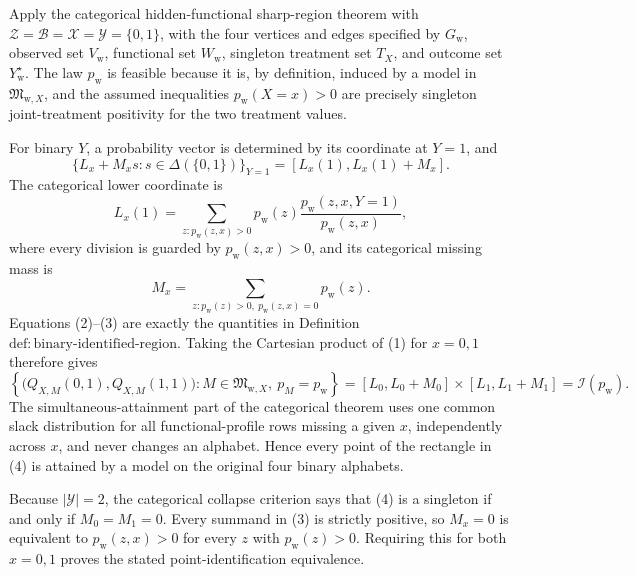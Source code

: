 Apply the categorical hidden-functional sharp-region theorem with
\(\mathcal Z=\mathcal B=\mathcal X=\mathcal Y=\{0,1\}\), with the four
vertices and edges specified by \(G_{\mathrm w}\), observed set
\(V_{\mathrm w}\), functional set \(W_{\mathrm w}\), singleton treatment
set \(T_X\), and outcome set \(Y_{\mathrm w}^{\star}\).  The law
\(p_{\mathrm w}\) is feasible because it is, by definition, induced by a
model in \(\mathfrak M_{\mathrm w,X}\), and the assumed inequalities
\(p_{\mathrm w}(X=x)>0\) are precisely singleton joint-treatment
positivity for the two treatment values.

For binary \(Y\), a probability vector is determined by its coordinate at
\(Y=1\), and
\[
 \{L_x+M_xs:s\in\Delta(\{0,1\})\}_{Y=1}
 =[L_x(1),L_x(1)+M_x].
\tag{1}
\]
The categorical lower coordinate is
\[
 L_x(1)
 =\sum_{z:p_{\mathrm w}(z,x)>0}
 p_{\mathrm w}(z)\frac{p_{\mathrm w}(z,x,Y=1)}{p_{\mathrm w}(z,x)},
\tag{2}
\]
where every division is guarded by \(p_{\mathrm w}(z,x)>0\), and its
categorical missing mass is
\[
 M_x=\sum_{z:p_{\mathrm w}(z)>0,\ p_{\mathrm w}(z,x)=0}
 p_{\mathrm w}(z).
\tag{3}
\]
Equations (2)--(3) are exactly the quantities in
Definition~\(\mathrm{def:binary\text{-}identified\text{-}region}\).
Taking the Cartesian product of (1) for \(x=0,1\) therefore gives
\[
 \left\{\bigl(Q_{X,M}(0,1),Q_{X,M}(1,1)\bigr):
 M\in\mathfrak M_{\mathrm w,X},\ p_M=p_{\mathrm w}\right\}
 =[L_0,L_0+M_0]\times[L_1,L_1+M_1]
 =\mathcal I(p_{\mathrm w}).
\tag{4}
\]
The simultaneous-attainment part of the categorical theorem uses one
common slack distribution for all functional-profile rows missing a given
\(x\), independently across \(x\), and never changes an alphabet.  Hence
every point of the rectangle in (4) is attained by a model on the original
four binary alphabets.

Because \(\lvert\mathcal Y\rvert=2\), the categorical collapse criterion
says that (4) is a singleton if and only if \(M_0=M_1=0\).  Every summand
in (3) is strictly positive, so \(M_x=0\) is equivalent to
\(p_{\mathrm w}(z,x)>0\) for every \(z\) with
\(p_{\mathrm w}(z)>0\).  Requiring this for both \(x=0,1\) proves the
stated point-identification equivalence.